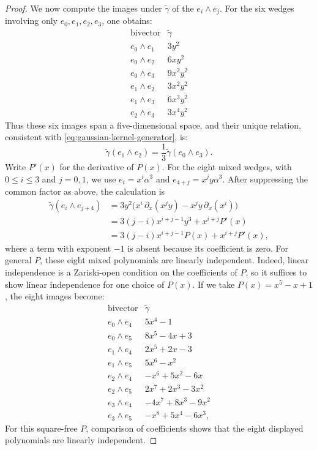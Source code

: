 \documentclass[10pt,a4paper]{amsart}
\begin{document}
\begin{proof}
We now compute the images under $\widetilde \gamma$ of the $e_i \wedge e_j$.
For the six wedges involving only $e_0,e_1,e_2,e_3$, one obtains:
\begin{equation*}
\begin{array}{c|c}
\text{bivector} & \widetilde\gamma \\ \hline
 e_0\wedge e_1 & 3y^2 \\
 e_0\wedge e_2 & 6xy^2 \\
 e_0\wedge e_3 & 9x^2y^2 \\
 e_1\wedge e_2 & 3x^2y^2 \\
 e_1\wedge e_3 & 6x^3y^2 \\
 e_2\wedge e_3 & 3x^4y^2
\end{array}
\end{equation*}
Thus these six images span a five-dimensional space, and their unique relation,
consistent with \eqref{eq:gaussian-kernel-generator}, is:
\begin{equation*}
\widetilde\gamma(e_1\wedge e_2)
=\frac13\widetilde\gamma(e_0\wedge e_3).
\end{equation*}
Write $P'(x)$ for the derivative of $P(x)$.  For the eight mixed wedges,
with $0\leq i\leq3$ and $j=0,1$, we use
$e_i=x^i\alpha^3$ and $e_{4+j}=x^jy\alpha^3$.  After suppressing the
common factor as above, the calculation is
\begin{equation}
\label{eq:mixed-gaussian-general-P}
\begin{aligned}
\widetilde\gamma (e_i \wedge e_{j+4})
&=
3y^2\bigl(x^i\,\partial_x(x^jy)-x^jy\,\partial_x(x^i)\bigr) \\
&=
3(j-i)x^{i+j-1}y^3+x^{i+j}P'(x) \\
&=
3(j-i)x^{i+j-1}P(x)+x^{i+j}P'(x),
\end{aligned}
\end{equation}
where a term with exponent $-1$ is absent because its coefficient is zero.  For general $P$, these eight {mixed} polynomials are linearly independent.  Indeed, linear independence is a Zariski-open condition on the coefficients of $P$, so it suffices to show linear independence for one {choice} of $P(x)$. If we take $P(x)=x^5-x+1$, the eight images become:
\begin{equation*}
\begin{array}{c|l}
\text{bivector} & \widetilde\gamma \\ \hline
 e_0\wedge e_4 & 5x^4-1 \\
 e_0\wedge e_5 & 8x^5-4x+3 \\
 e_1\wedge e_4 & 2x^5+2x-3 \\
 e_1\wedge e_5 & 5x^6-x^2 \\
 e_2\wedge e_4 & -x^6+5x^2-6x \\
 e_2\wedge e_5 & 2x^7+2x^3-3x^2 \\
 e_3\wedge e_4 & -4x^7+8x^3-9x^2 \\
 e_3\wedge e_5 & -x^8+5x^4-6x^3,
\end{array}
\end{equation*}
{For this square-free $P$, comparison of coefficients shows that
the eight displayed polynomials are linearly independent.}


\end{proof}
\end{document}

